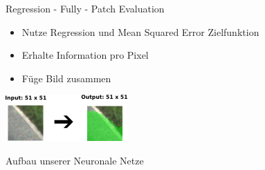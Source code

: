 \begin{frame}{Regression - Fully - Patch Evaluation}
\begin{minipage}{0.59\textwidth}
\begin{itemize}
\item Nutze Regression und Mean Squared Error Zielfunktion \\
\item Erhalte Information pro Pixel
\item Füge Bild zusammen \\
\end{itemize}
\end{minipage}
\begin{minipage}{0.39\textwidth}
	\flushright
      \includegraphics[]{../images/models/fully-conv.png}
\end{minipage}


\end{frame}

\begin{frame}{Aufbau unserer Neuronale Netze}
	\centering


\end{frame}